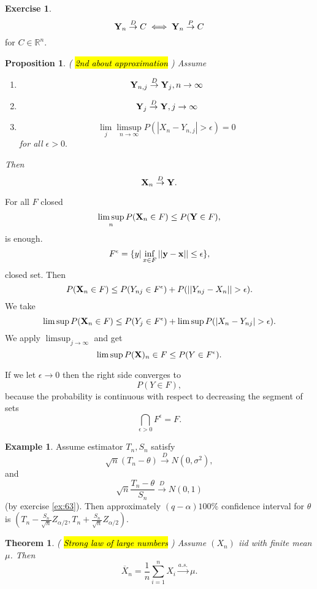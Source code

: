 \documentclass[12pt,a4paper, notitlepage]{book}
\newcommand{\hlc}[2][yellow]{ {\sethlcolor{#1} \hl{#2}} }
\theoremstyle{definition} %
\newtheorem{example}[definition]{Example}
\newtheorem{exercise}[definition]{Exercise}
\theoremstyle{plain} %
\newtheorem{theorem}[definition]{Theorem}
\newtheorem{proposition}[definition]{Proposition}
\newcommand{\R}{\mathbb R}
\newcommand{\Important}[1]{ {\it \hlc{#1} } }
\begin{document}
\begin{exercise}
\[ {\bf Y}_n \overset{D}{ \rightarrow} C \iff {\bf Y}_n \overset{P}{ \rightarrow} C\]
 for $C \in \R^n$.
\end{exercise}

\begin{proposition} (\Important{2nd about approximation})
Assume 
\begin{enumerate}
\item \[ {\bf Y}_{n,j} \overset{D}{\rightarrow} {\bf Y}_j, n \rightarrow \infty \]
\item \[ {\bf Y}_j  \overset{D}{\rightarrow} {\bf Y}, j \rightarrow \infty \]
\item \[ \lim_j \limsup_{n\rightarrow \infty}{P(|X_n - Y_{n,j}| > \epsilon)} = 0 \] for all $\epsilon > 0.$
\end{enumerate}
Then 
\[ {\bf X}_n \overset{D}{\rightarrow} {\bf Y}. \]
\end{proposition}
\proof
For all $F $ closed 
\[ \limsup_n{P({\bf X}_n \in F)} \leq P({\bf Y} \in F) , \]
 is enough. 
\[ F^\epsilon = \{y | \inf_{x\in F}||{\bf y} - {\bf x}|| \leq \epsilon \} , \]
 closed set. Then 
\[ P({\bf X}_n \in F) \leq P(Y_{n j} \in F^\epsilon) + P(||Y_{n j} - X_n|| > \epsilon). \]
 We take 
\[ \limsup{P({\bf X}_n \in F)} \leq P(Y_j \in F^\epsilon) + \limsup{P(|X_n - Y_{n j}| > \epsilon)}. \]
 We apply $\limsup_{j\to \infty}$ and get 
\[ \limsup{P({\bf X})_n \in F} \leq P(Y \in F^\epsilon). \]

If we let $\epsilon \rightarrow 0$ then the right side converges to 
\[ P(Y \in F) , \] because the probability is continuous with respect to decreasing the segment of sets 
\[ \bigcap_{\epsilon > 0} F^\epsilon = F. \]
\endproof

\begin{example}
Assume estimator $T_n, S_n$ satisfy 
\[ \sqrt{n}(T_n - \theta) \overset{D}{\rightarrow} N(0, \sigma^2) , \]
 and 
\[ \sqrt{n}\frac{T_n - \theta}{S_n} \overset{D}{\rightarrow} N(0,1) \] (by exercise \ref{ex:63}).
Then approximately $(q - \alpha) 100 \%$ confidence interval for $\theta$ is $(T_n - \frac{S_n}{\sqrt{n}}Z_{\alpha/2},T_n + \frac{S_n}{\sqrt{n}}Z_{\alpha/2})$.
\end{example}

\begin{theorem} (\Important{Strong law of large numbers} )
Assume $(X_n)$ iid with finite mean $\mu$. Then 
\[ \overline{X}_n = \frac{1}{n} \sum _{i=1}^n X_i \overset{a.s.}{ \rightarrow}\mu . \]
\end{theorem}
\end{document}
